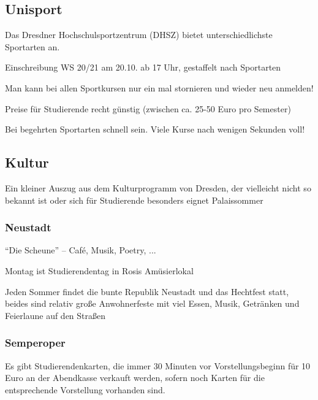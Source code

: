 \documentclass[a4paper,12pt]{scrreprt}
\begin{document}
\subsection{Unisport}
\begin{itemize*}
    \item Das Dresdner Hochschulsportzentrum (DHSZ) bietet unterschiedlichste Sportarten an.

    \item Einschreibung WS 20/21 am 20.10. ab 17 Uhr, gestaffelt nach Sportarten
    \item Man kann  bei allen Sportkursen nur ein mal stornieren und wieder neu anmelden!
    \item Preise für Studierende recht günstig (zwischen ca. 25-50 Euro pro Semester)
    \item Bei begehrten Sportarten schnell sein. Viele Kurse nach wenigen Sekunden voll!
\end{itemize*}

\subsection{Kultur}
Ein kleiner Auszug aus dem Kulturprogramm von Dresden, der vielleicht nicht so bekannt ist oder sich für Studierende besonders eignet
Palaissommer

\subsubsection{Neustadt}
\begin{itemize*}
    \item \enquote{Die Scheune} -- Café, Musik, Poetry, ...
    \item Montag ist Studierendentag in Rosis Amüsierlokal
    \item Jeden Sommer findet die bunte Republik Neustadt und das Hechtfest statt, beides sind relativ große Anwohnerfeste mit viel Essen, Musik, Getränken und Feierlaune auf den Straßen
\end{itemize*}

\subsubsection{Semperoper}
\begin{itemize*}
    \item Es gibt Studierendenkarten, die immer 30 Minuten vor Vorstellungsbeginn für 10 Euro an der Abendkasse verkauft werden, sofern noch Karten für die entsprechende Vorstellung vorhanden sind.
\end{itemize*}
\end{document}
